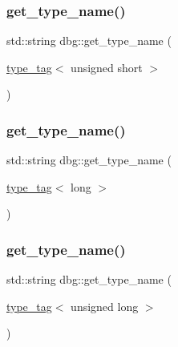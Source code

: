 \subsubsection{\texorpdfstring{get\+\_\+type\+\_\+name()}{get\_type\_name()}\hspace{0.1cm}{\footnotesize\ttfamily [3/10]}}
{\footnotesize\ttfamily std\+::string dbg\+::get\+\_\+type\+\_\+name (\begin{DoxyParamCaption}\item[{\hyperlink{structdbg_1_1type__tag}{type\+\_\+tag}$<$ unsigned short $>$}]{ }\end{DoxyParamCaption})\hspace{0.3cm}{\ttfamily [inline]}}

\mbox{\label{namespacedbg_a380f1bf409dda5e8c67a269b27d14aee}} 
\subsubsection{\texorpdfstring{get\+\_\+type\+\_\+name()}{get\_type\_name()}\hspace{0.1cm}{\footnotesize\ttfamily [4/10]}}
{\footnotesize\ttfamily std\+::string dbg\+::get\+\_\+type\+\_\+name (\begin{DoxyParamCaption}\item[{\hyperlink{structdbg_1_1type__tag}{type\+\_\+tag}$<$ long $>$}]{ }\end{DoxyParamCaption})\hspace{0.3cm}{\ttfamily [inline]}}

\mbox{\label{namespacedbg_a5316d9f58e72c20cfbb14496326d89f1}} 
\subsubsection{\texorpdfstring{get\+\_\+type\+\_\+name()}{get\_type\_name()}\hspace{0.1cm}{\footnotesize\ttfamily [5/10]}}
{\footnotesize\ttfamily std\+::string dbg\+::get\+\_\+type\+\_\+name (\begin{DoxyParamCaption}\item[{\hyperlink{structdbg_1_1type__tag}{type\+\_\+tag}$<$ unsigned long $>$}]{ }\end{DoxyParamCaption})\hspace{0.3cm}{\ttfamily [inline]}}

